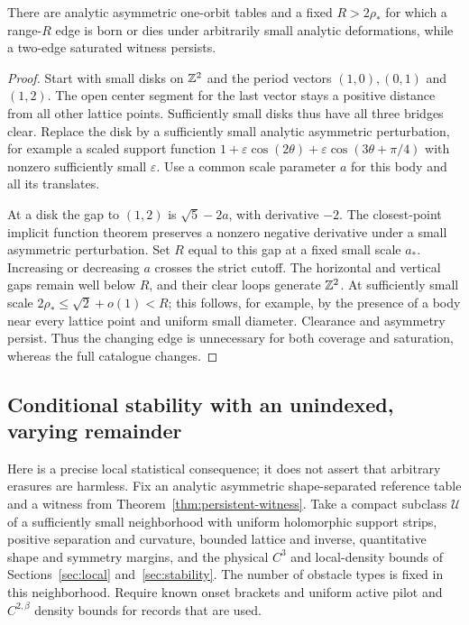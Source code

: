 \begin{proposition}\label{prop:cutoff-crossing}
There are analytic asymmetric one-orbit tables and a fixed
$R>2\rho_*$ for which a range-$R$ edge is born or dies under arbitrarily
small analytic deformations, while a two-edge saturated witness persists.
\end{proposition}
\begin{proof}
Start with small disks on $\mathbb Z^2$ and the period vectors $(1,0),(0,1)$
and $(1,2)$. The open center segment for the last vector stays a positive
distance from all other lattice points. Sufficiently small disks thus
have all three bridges clear. Replace the disk by a sufficiently small
analytic asymmetric perturbation, for example a scaled support function
$1+\varepsilon\cos(2\theta)+\varepsilon\cos(3\theta+\pi/4)$
with nonzero sufficiently small $\varepsilon$. Use a common scale
parameter $a$ for this body and all its translates.

At a disk the gap to $(1,2)$ is $\sqrt5-2a$, with derivative $-2$.
The closest-point implicit function theorem preserves a nonzero negative
derivative under a small asymmetric perturbation. Set $R$ equal to this
gap at a fixed small scale $a_*$. Increasing or decreasing $a$ crosses
the strict cutoff. The horizontal and vertical gaps remain well below
$R$, and their clear loops generate $\mathbb Z^2$. At sufficiently small scale
$2\rho_*\le\sqrt2+o(1)<R$; this follows, for example, by the presence
of a body near every lattice point and uniform small diameter.
Clearance and asymmetry persist. Thus the changing edge is unnecessary
for both coverage and saturation, whereas the full catalogue changes.
\end{proof}

\subsection{Conditional stability with an unindexed, varying remainder}
Here is a precise local statistical consequence; it does not assert that
arbitrary erasures are harmless. Fix an analytic asymmetric shape-separated
reference table and a witness from Theorem~\ref{thm:persistent-witness}.
Take a compact subclass $\mathcal U$ of a sufficiently small neighborhood
with uniform holomorphic support strips, positive separation and curvature,
bounded lattice and inverse, quantitative shape and symmetry margins,
and the physical $C^3$ and local-density bounds of Sections~\ref{sec:local}
and~\ref{sec:stability}. The number of obstacle types is fixed in this
neighborhood. Require known onset brackets and uniform active pilot and
$C^{2,\beta}$ density bounds for records that are used.

